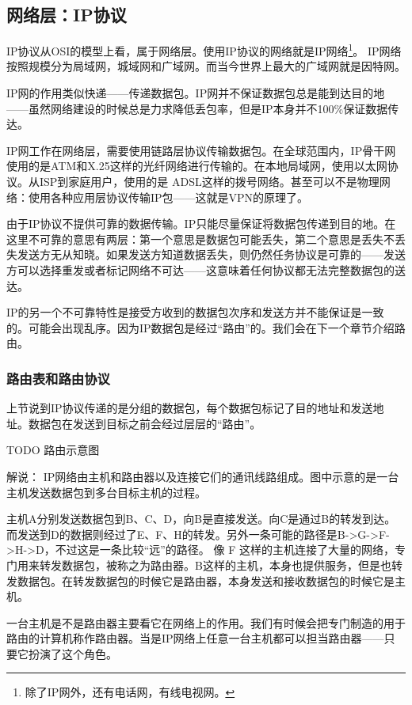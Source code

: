\subsection{网络层：IP协议}

IP协议从OSI的模型上看，属于网络层。使用IP协议的网络就是IP网络\footnote{除了IP网外，还有电话网，有线电视网。}。
IP网络按照规模分为局域网，城域网和广域网。而当今世界上最大的广域网就是因特网。

IP网的作用类似快递——传递数据包。IP网并不保证数据包总是能到达目的地——虽然网络建设的时候总是力求降低丢包率，但是IP本身并不100\%保证数据传达。

IP网工作在网络层，需要使用链路层协议传输数据包。在全球范围内，IP骨干网使用的是ATM和X.25这样的光纤网络进行传输的。在本地局域网，使用以太网协议。从ISP到家庭用户，使用的是
ADSL这样的拨号网络。甚至可以不是物理网络：使用各种应用层协议传输IP包——这就是VPN的原理了。

由于IP协议不提供可靠的数据传输。IP只能尽量保证将数据包传递到目的地。在这里不可靠的意思有两层：第一个意思是数据包可能丢失，第二个意思是丢失不丢失发送方无从知晓。如果发送方知道数据丢失，则仍然任务协议是可靠的——发送方可以选择重发或者标记网络不可达——这意味着任何协议都无法完整数据包的送达。

IP的另一个不可靠特性是接受方收到的数据包次序和发送方并不能保证是一致的。可能会出现乱序。因为IP数据包是经过“路由”的。我们会在下一个章节介绍路由。

\subsubsection{路由表和路由协议}

上节说到IP协议传递的是分组的数据包，每个数据包标记了目的地址和发送地址。数据包在发送到目标之前会经过层层的“路由”。

TODO 路由示意图

解说： IP网络由主机和路由器以及连接它们的通讯线路组成。图中示意的是一台主机发送数据包到多台目标主机的过程。

主机A分别发送数据包到B、C、D，向B是直接发送。向C是通过B的转发到达。而发送到D的数据则经过了E、F、H的转发。另外一条可能的路径是B->G->F->H->D，不过这是一条比较“远”的路径。
像 F 这样的主机连接了大量的网络，专门用来转发数据包，被称之为路由器。B这样的主机，本身也提供服务，但是也转发数据包。在转发数据包的时候它是路由器，本身发送和接收数据包的时候它是主机。

一台主机是不是路由器主要看它在网络上的作用。我们有时候会把专门制造的用于路由的计算机称作路由器。当是IP网络上任意一台主机都可以担当路由器——只要它扮演了这个角色。

